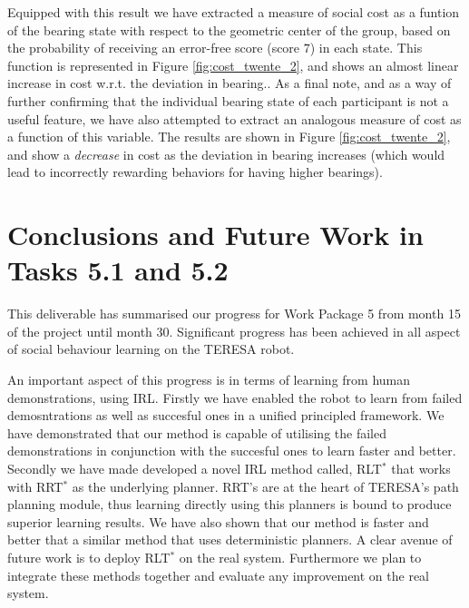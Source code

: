 \documentclass[a4paper,11pt]{report}
\begin{document}
Equipped with this result we have extracted a measure of social cost as a funtion of the bearing state with respect to the geometric center of the group, based on the probability of receiving an error-free score (score $7$) in each state. This function is represented in Figure \ref{fig:cost_twente_2}, and shows an almost linear increase in cost w.r.t. the deviation in bearing.. As a final note, and as a way of further confirming that the individual bearing state of each participant is not a useful feature, we have also attempted to extract an analogous measure of cost as a function of this variable. The results are shown in Figure \ref{fig:cost_twente_2}, and show a \emph{decrease} in cost as the deviation in bearing increases (which would lead to incorrectly rewarding behaviors for having higher bearings).


\section{Conclusions and Future Work in Tasks 5.1 and 5.2}
\label{sec:conclusions}
This deliverable has summarised our progress for Work Package 5 from month 15 of the project until month 30. Significant progress has been achieved in all aspect of social behaviour learning on the TERESA robot. 

 An important aspect of this progress is in terms of learning from human demonstrations, using IRL. Firstly we have enabled the robot to learn from failed demosntrations as well as succesful ones in a unified principled framework. We have demonstrated that our method is capable of utilising the failed demonstrations in conjunction with the succesful ones to learn faster and better. Secondly we have made developed a novel IRL method called, RLT$^*$ that works with RRT$^*$ as the underlying planner. RRT's are at the heart of TERESA's path planning module, thus learning directly using this planners is bound to produce superior learning results. We have also shown that our method is faster and better that a similar method that uses deterministic planners. A clear avenue of future work is to deploy RLT$^*$ on the real system. Furthermore we plan to integrate these methods together and evaluate any improvement on the real system.
\end{document}
